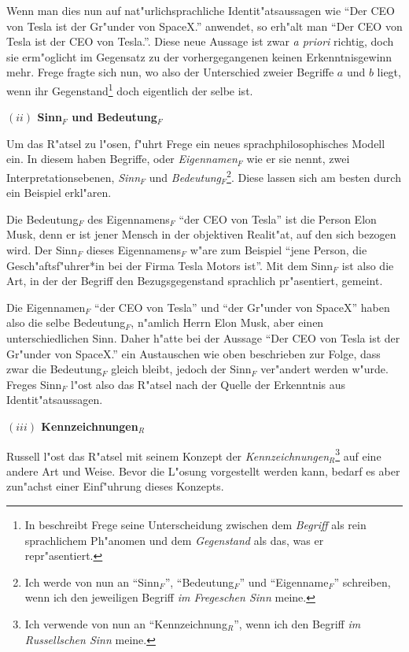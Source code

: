 \documentclass[a4paper, emulatestandardclasses, 12pt]{scrartcl}
\begin{document}
\begin{onehalfspace}
Wenn man dies nun auf nat"urlichsprachliche Identit"atsaussagen wie "`Der CEO von Tesla ist der Gr"under von SpaceX."' anwendet, so erh"alt man "`Der CEO von Tesla ist der CEO von Tesla."'. Diese neue Aussage ist zwar \emph{a priori} richtig, doch sie erm"oglicht im Gegensatz zu der vorhergegangenen keinen Erkenntnisgewinn mehr. Frege fragte sich nun, wo also der Unterschied zweier Begriffe $a$ und $b$ liegt, wenn ihr Gegenstand\footnote{In \citep{begriffundgegenstand} beschreibt Frege seine Unterscheidung zwischen dem \emph{Begriff} als rein sprachlichem Ph"anomen und dem \emph{Gegenstand} als das, was er repr"asentiert.} doch eigentlich der selbe ist.\vspace{3mm}

\noindent\textbf{$(ii)$ Sinn$_{F}$ und Bedeutung$_{F}$}	

\noindent Um das R"atsel zu l"osen, f"uhrt Frege ein neues sprachphilosophisches Modell ein. In diesem haben Begriffe, oder \emph{Eigennamen$_{F}$} wie er sie nennt, zwei Interpretationsebenen, \emph{Sinn$_{F}$} und \emph{Bedeutung$_{F}$}\footnote{Ich werde von nun an "`Sinn$_{F}$"', "`Bedeutung$_{F}$"' und "`Eigenname$_{F}$"' schreiben, wenn ich den jeweiligen Begriff \emph{im Fregeschen Sinn} meine.}. Diese lassen sich am besten durch ein Beispiel erkl"aren.

Die Bedeutung$_{F}$ des Eigennamens$_{F}$ "`der CEO von Tesla"' ist die Person Elon Musk, denn er ist jener Mensch in der objektiven Realit"at, auf den sich bezogen wird. Der Sinn$_{F}$ dieses Eigennamens$_{F}$ w"are zum Beispiel  "`jene Person, die Gesch"aftsf"uhrer*in bei der Firma Tesla Motors ist"'. Mit dem Sinn$_{F}$ ist also die Art, in der der Begriff den Bezugsgegenstand sprachlich pr"asentiert, gemeint.

Die Eigennamen$_{F}$ "`der CEO von Tesla"' und "`der Gr"under von SpaceX"' haben also die selbe Bedeutung$_{F}$, n"amlich Herrn Elon Musk, aber einen unterschiedlichen Sinn. Daher h"atte bei der Aussage "`Der CEO von Tesla ist der Gr"under von SpaceX."' ein Austauschen wie oben beschrieben zur Folge, dass zwar die Bedeutung$_{F}$ gleich bleibt, jedoch der Sinn$_{F}$ ver"andert werden w"urde. Freges Sinn$_{F}$ l"ost also das R"atsel nach der Quelle der Erkenntnis aus Identit"atsaussagen. \vspace{3mm}

\noindent\textbf{$(iii)$ Kennzeichnungen$_{R}$}	

\noindent Russell l"ost das R"atsel mit seinem Konzept der \emph{Kennzeichnungen}$_{R}$\footnote{Ich verwende von nun an "`Kennzeichnung$_{R}$"', wenn ich den Begriff \emph{im Russellschen Sinn} meine.} auf eine andere Art und Weise. Bevor die L"osung vorgestellt werden kann, bedarf es aber zun"achst einer Einf"uhrung dieses Konzepts. 


\end{onehalfspace}
\end{document}
